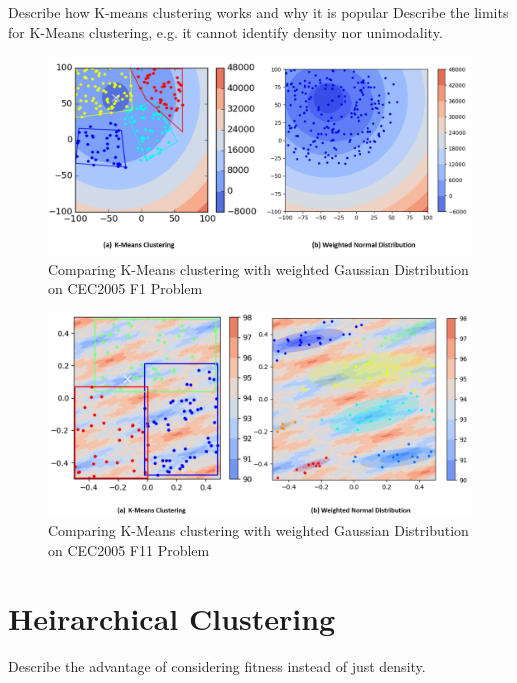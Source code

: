 Describe how K-means clustering works and why it is popular Describe the limits for K-Means clustering, 
e.g. it cannot identify density nor unimodality.  

\begin{figure} 
\centering
\includegraphics[width=\textwidth]{Clustering_comparison} 
\caption{Comparing K-Means clustering with weighted Gaussian Distribution on CEC2005 F1 Problem}\label{fig:Clustering_comparison}
\end{figure}

\begin{figure}[ht!]
\centering
\includegraphics[width=\textwidth]{Clustering_comparison_F11}
\caption{Comparing K-Means clustering with weighted Gaussian Distribution on CEC2005 F11 Problem}\label{fig:Clustering_comparison_F11}
\end{figure}



\section{Heirarchical Clustering}
Describe the advantage of considering fitness instead of just density.



